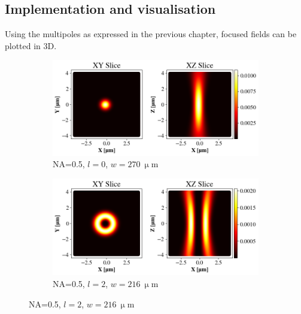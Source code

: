 \subsection{Implementation and visualisation}
Using the multipoles as expressed in the previous chapter, focused fields can be plotted in 3D.

\begin{figure}
    \begin{subfigure}[b]{0.49\textwidth}
        \centering
        \includegraphics[width=\textwidth]{Figures/Efoc_NA5_l0.png}
        \caption{NA=0.5, \( l=0 \), \( w=270\ \mathrm{\upmu m} \)}
        \label{fig:a}
    \end{subfigure}
    \begin{subfigure}[b]{0.49\textwidth}
        \includegraphics[width=\textwidth]{Figures/Efoc_NA5_l2.png}
        \caption{NA=0.5, \( l=2 \), \( w=216\ \mathrm{\upmu m} \)}
        \label{fig:b}
    \end{subfigure}

    \par


\end{figure}
